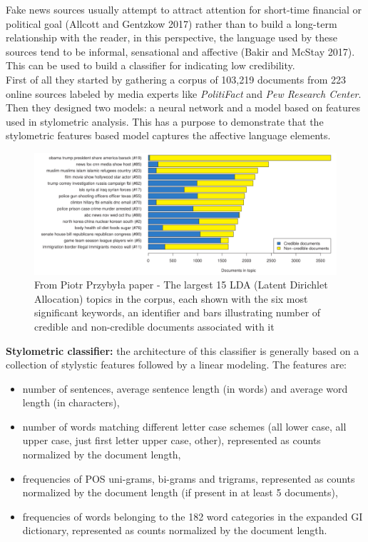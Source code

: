 \documentclass[10pt, english]{report}
\begin{document}
Fake news sources usually attempt to attract attention for short-time financial or political goal (Allcott and Gentzkow 2017) rather than to build a long-term relationship with the reader, in this perspective, the language used by these sources tend to be informal, sensational and affective (Bakir and McStay 2017). This can be used to build a classifier for indicating low credibility.\\

First of all they started by gathering a corpus of 103,219 documents from 223 online sources labeled by media experts like \textit{PolitiFact} and \textit{Pew Research Center}. Then they designed two models: a neural network and a model based on features used in stylometric analysis. This has a purpose to demonstrate that the stylometric features based model captures the affective language elements.\\

\begin{figure}[H]
	\centering
	\includegraphics[scale=0.4]{img/documents_in_topic.png}
	\caption{From Piotr Przybyła paper - The largest 15 LDA (Latent Dirichlet Allocation) topics in the corpus, each shown with the six most signiﬁcant keywords, an identiﬁer and bars illustrating number of credible and non-credible documents associated with it}
\end{figure}

\textbf{Stylometric classifier:} the architecture of this classifier is generally based on a collection of stylystic features followed by a linear modeling. The features are: 
	\begin{itemize}
	\item number of sentences, average sentence length (in words) and average word length (in characters),
	\item number of words matching different letter case schemes (all lower case, all upper case, just first letter upper case, other), represented as counts normalized by the document length,
	\item frequencies of POS uni-grams, bi-grams and trigrams, represented as counts normalized by the document length (if present in at least 5 documents),
	\item frequencies of words belonging to the 182 word categories in the expanded GI dictionary, represented as counts normalized by the document length.
	\end{itemize}
\end{document}
